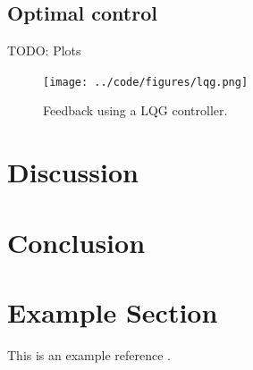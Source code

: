 \documentclass[a4paper, titlepage]{article}
\begin{document}
\subsection{Optimal control}
TODO: Plots

\begin{figure}[H]
\center
\texttt{[image: ../code/figures/lqg.png]}
\caption{Feedback using a LQG controller.}
\label{fig:lqgControl}
\end{figure}


\section{Discussion}



\section{Conclusion}

\clearpage


\clearpage
\appendix

\section{Example Section}
This is an example reference \citep{glad00}.



\end{document}
